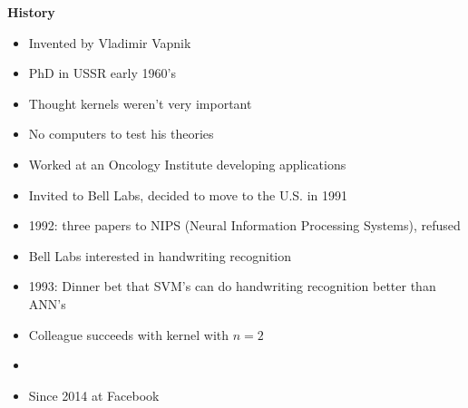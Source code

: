 \textbf{History}
\begin{itemize}
\item Invented by Vladimir Vapnik
\item PhD in USSR early 1960's
\item Thought kernels weren't very important
\item No computers to test his theories
\item Worked at an Oncology Institute developing applications
\item Invited to Bell Labs, decided to move to the U.S. in 1991
\item 1992: three papers to NIPS (Neural Information Processing Systems), refused
\item Bell Labs interested in handwriting recognition
\item 1993: Dinner bet that SVM's can do handwriting recognition better than ANN's
\item Colleague succeeds with kernel with $n=2$
\item {}
\item Since 2014 at Facebook
\end{itemize}







